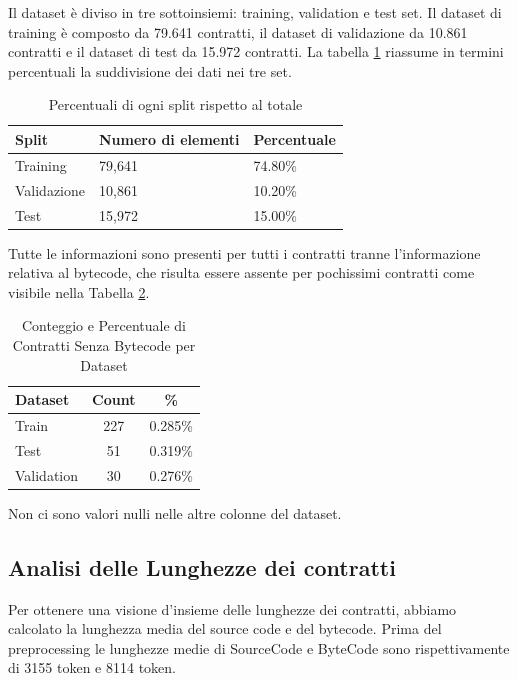 \documentclass[../../Thesis.tex]{subfiles}
\begin{document}
Il dataset \`e diviso in tre sottoinsiemi: training, validation e test set.
Il dataset di training \`e composto da 79.641 contratti, il dataset di validazione da 10.861 contratti e il dataset di test da 15.972 contratti. La tabella \ref{tab:split} riassume in termini percentuali la suddivisione dei dati nei tre set.
\begin{table}[h!]
    \centering
    \begin{tabular}{|l|l|l|}
    \hline
    \textbf{Split} & \textbf{Numero di elementi} & \textbf{Percentuale} \\ \hline
    Training       & 79,641                        & 74.80\%               \\ \hline
    Validazione    & 10,861                        & 10.20\%               \\ \hline
    Test           & 15,972                        & 15.00\%               \\ \hline
    \end{tabular}
    \caption{Percentuali di ogni split rispetto al totale}
    \label{tab:split}
\end{table}
    
Tutte le informazioni sono presenti per tutti i contratti tranne l'informazione relativa al bytecode, che risulta essere assente per pochissimi contratti come visibile nella Tabella \ref{tab:no_bytecode_count}. 
\begin{table}[h!]
    \centering
    \begin{tabular}{|l|c|c|}
        \hline
        \textbf{Dataset} & \textbf{Count} & \textbf{\%} \\
        \hline
        Train & 227 & 0.285\% \\
        Test & 51 & 0.319\% \\
        Validation & 30 & 0.276\% \\
        \hline
    \end{tabular}
    \caption{Conteggio e Percentuale di Contratti Senza Bytecode per Dataset}
    \label{tab:no_bytecode_count}
\end{table}
Non ci sono valori nulli nelle altre colonne del dataset.
\subsection{Analisi delle Lunghezze dei contratti}
Per ottenere una visione d'insieme delle lunghezze dei contratti, abbiamo calcolato la lunghezza media del source code e del bytecode. Prima del preprocessing le lunghezze medie di SourceCode e ByteCode sono rispettivamente di 3155 token e 8114 token.
\end{document}
